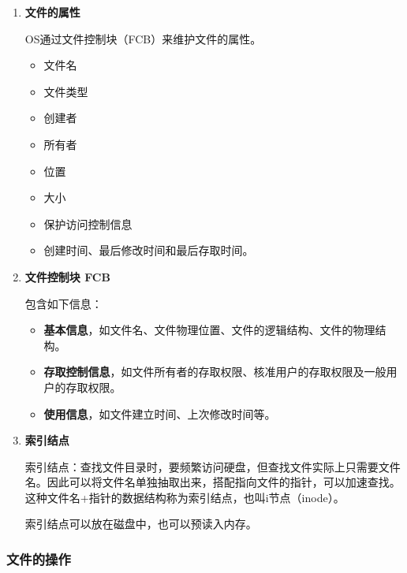 \documentclass[12pt, a4paper, oneside]{ctexart}
\begin{document}
\begin{enumerate}
  \item {\bf 文件的属性}
  
  OS通过文件控制块（FCB）来维护文件的属性。

  \begin{itemize}
    \item 文件名
    \item 文件类型
    \item 创建者
    \item 所有者
    \item 位置
    \item 大小
    \item 保护访问控制信息
    \item 创建时间、最后修改时间和最后存取时间。
  \end{itemize}

  \item {\bf 文件控制块 FCB}
  
  包含如下信息：
  \begin{itemize}
    \item {\bf 基本信息}，如文件名、文件物理位置、文件的逻辑结构、文件的物理结构。
    \item {\bf 存取控制信息}，如文件所有者的存取权限、核准用户的存取权限及一般用户的存取权限。
    \item {\bf 使用信息}，如文件建立时间、上次修改时间等。
  \end{itemize}

  \item {\bf 索引结点}
  
  索引结点：查找文件目录时，要频繁访问硬盘，但查找文件实际上只需要文件名。因此可以将文件名单独抽取出来，搭配指向文件的指针，可以加速查找。这种文件名+指针的数据结构称为索引结点，也叫i节点（inode）。

  索引结点可以放在磁盘中，也可以预读入内存。
\end{enumerate}

\subsubsection{文件的操作}
\end{document}
